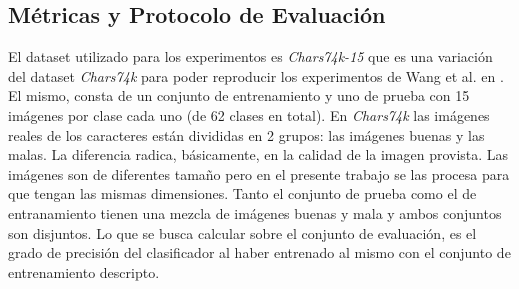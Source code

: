 \subsection{Métricas y Protocolo de Evaluación}

	El dataset utilizado para los experimentos es \textit{Chars74k-15} que es una variación del dataset \textit{Chars74k} para poder reproducir los experimentos de Wang et al. en \cite{wang}. El mismo, consta de un conjunto de entrenamiento y uno de prueba con 15 imágenes por clase cada uno (de 62 clases en total). En \textit{Chars74k} las imágenes reales de los caracteres están divididas en 2 grupos: las imágenes buenas y las malas. La diferencia radica, básicamente, en la calidad de la imagen provista. Las imágenes son de diferentes tamaño pero en el presente trabajo se las procesa para que tengan las mismas dimensiones. Tanto el conjunto de prueba como el de entranamiento tienen una mezcla de imágenes buenas y mala y ambos conjuntos son disjuntos.  Lo que se busca calcular sobre el conjunto de evaluación, es el grado de precisión del clasificador al haber entrenado al mismo con el conjunto de entrenamiento descripto.